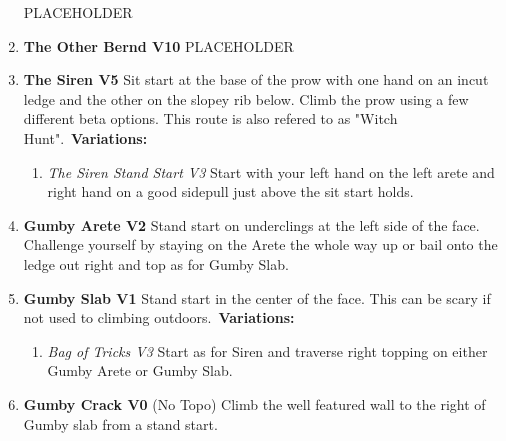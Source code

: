 \begin{multicols*}{2}
\begin{enumerate}[]
					\newline PLACEHOLDER\
					\setcounter{enumi}{15}
					\item\label{rt:The Other Bernd} \colorbox{red!20}{\textbf{The Other Bernd V10  } }
					\newline PLACEHOLDER\
					\setcounter{enumi}{16}
					\item\label{rt:The Siren} \colorbox{RoyalBlue!20}{\textbf{The Siren V5     } }
					\newline Sit start at the base of the prow with one hand on an incut ledge and the other on the slopey rib below. Climb the prow using a few different beta options. This route is also refered to as "Witch Hunt".\
					\newline \textbf{Variations:}
					\begin{enumerate}
						\item\label{vr:The Siren Stand Start} \colorbox{green!20}{\emph{The Siren Stand Start V3    }  }
						\newline Start with your left hand on the left arete and right hand on a good sidepull just above the sit start holds.\
					\end{enumerate}
					\setcounter{enumi}{17}
					\item\label{rt:Gumby Arete} \colorbox{green!20}{\textbf{Gumby Arete V2 \ding{72} \ding{72}  } }
					\newline Stand start on underclings at the left side of the face. Challenge yourself by staying on the Arete the whole way up or bail onto the ledge out right and top as for Gumby Slab.\
					\setcounter{enumi}{18}
					\item\label{rt:Gumby Slab} \colorbox{green!20}{\textbf{Gumby Slab V1     } }
					\newline Stand start in the center of the face. This can be scary if not used to climbing outdoors.\
					\newline \textbf{Variations:}
					\begin{enumerate}
						\item\label{vr:Bag of Tricks} \colorbox{green!20}{\emph{Bag of Tricks V3 \ding{72}  }  }
						\newline Start as for Siren and traverse right topping on either Gumby Arete or Gumby Slab.\
					\end{enumerate}
					\setcounter{enumi}{19}
					\item\label{rt:Gumby Crack} \colorbox{green!20}{\textbf{Gumby Crack V0  \ding{72}  } }
						\newline (No Topo) 
					\newline Climb the well featured wall to the right of Gumby slab from a stand start.\
				\end{enumerate}

\end{multicols*}
